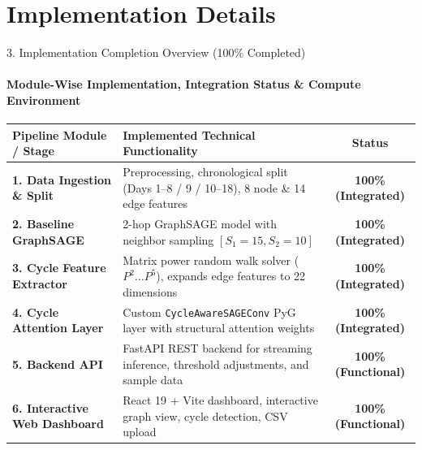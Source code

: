 \documentclass[aspectratio=169, 11pt]{beamer}
\begin{document}
\section{Implementation Details}

\begin{frame}{3. Implementation Completion Overview (100\% Completed)}
    \framesubtitle{Module-Wise Implementation, Integration Status \& Compute Environment}
    \vspace{-0.1cm}
    \begin{table}
        \centering
        \scriptsize
        \renewcommand{\arraystretch}{1.15}
        \begin{tabularx}{\textwidth}{p{3.4cm} X c}
            \toprule
            \textbf{Pipeline Module / Stage} & \textbf{Implemented Technical Functionality} & \textbf{Status} \\
            \midrule
            \textbf{1. Data Ingestion \& Split} & Preprocessing, chronological split (Days 1--8 / 9 / 10--18), 8 node \& 14 edge features & \textbf{\textcolor{safeGreen}{100\% (Integrated)}} \\
            \textbf{2. Baseline GraphSAGE} & 2-hop GraphSAGE model with neighbor sampling $[S_1=15, S_2=10]$ & \textbf{\textcolor{safeGreen}{100\% (Integrated)}} \\
            \textbf{3. Cycle Feature Extractor} & Matrix power random walk solver ($P^2 \dots P^5$), expands edge features to 22 dimensions & \textbf{\textcolor{safeGreen}{100\% (Integrated)}} \\
            \textbf{4. Cycle Attention Layer} & Custom \texttt{CycleAwareSAGEConv} PyG layer with structural attention weights & \textbf{\textcolor{safeGreen}{100\% (Integrated)}} \\
            \textbf{5. Backend API} & FastAPI REST backend for streaming inference, threshold adjustments, and sample data & \textbf{\textcolor{safeGreen}{100\% (Functional)}} \\
            \textbf{6. Interactive Web Dashboard} & React 19 + Vite dashboard, interactive graph view, cycle detection, CSV upload & \textbf{\textcolor{safeGreen}{100\% (Functional)}} \\
            \bottomrule
        \end{tabularx}
    \end{table}
    \vspace{-0.1cm}


\end{frame}
\end{document}

